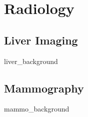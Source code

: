 \chapter{Radiology}


\section{Liver Imaging}
{liver_background}

\section{Mammography}
{mammo_background}



